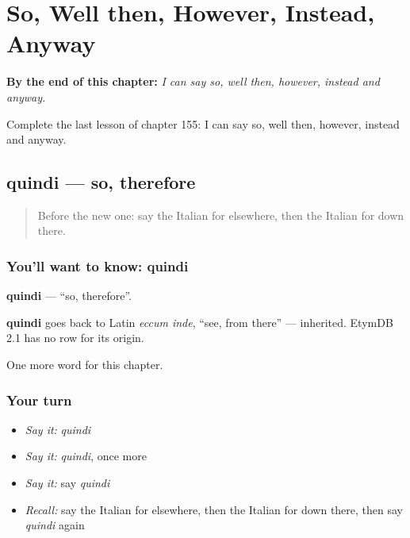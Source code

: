 
\chapter{So, Well then, However, Instead, Anyway}
\label{ch:it-so-well-then-however-instead-anyway}

\begin{chapteropening}
\textbf{By the end of this chapter:} \emph{I can say so, well then, however, instead and anyway.}

Complete the last lesson of chapter 155: I can say so, well then, however, instead and anyway.
\end{chapteropening}

\section[quindi]{quindi — so, therefore}

\label{lesson:IT-C155-quindi}



\begin{quote}
Before the new one: say the Italian for elsewhere, then the Italian for down there.
\end{quote}

\subsection*{You'll want to know: quindi}
\textbf{quindi} — \textquotedblleft{}so, therefore\textquotedblright{}.

\begin{cousinweb}
\textbf{quindi} goes back to Latin \emph{eccum inde}, \textquotedblleft{}see, from there\textquotedblright{} — inherited. EtymDB 2.1 has no row for its origin.
\end{cousinweb}

\begin{grammarlens}[title={What you've built}]
One more word for this chapter.
\end{grammarlens}

\subsection*{Your turn}
\begin{itemize}
\raggedright
  \item \emph{Say it:} \emph{quindi}
  \item \emph{Say it:} \emph{quindi}, once more
  \item \emph{Say it:} say \emph{quindi}
  \item \emph{Recall:} say the Italian for elsewhere, then the Italian for down there, then say \emph{quindi} again
\end{itemize}

